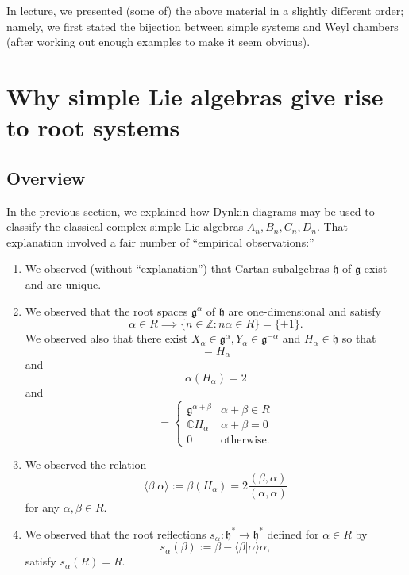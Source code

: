\documentclass[reqno]{amsart} 
\begin{document}
In lecture, we presented (some of) the above material in a slightly different order; namely, we first stated the bijection between simple systems and Weyl chambers (after working out enough examples to make it seem obvious).


\section{Why simple Lie algebras give rise to root systems}
\label{sec:orgbc4b3b3}

\subsection{Overview\label{sec:overview:simple-lie-alg-induce-root-systems}}
\label{sec:orgca704ad}
In the previous section, we explained how Dynkin diagrams may be used to classify the classical complex simple Lie algebras $A_n,B_n,C_n,D_n$.  That explanation involved a fair number of ``empirical observations:''
\begin{enumerate}
\item We observed (without ``explanation'') that Cartan subalgebras $\mathfrak{h}$ of $\mathfrak{g}$ exist and are unique.
\item We observed that the root spaces $\mathfrak{g}^\alpha$ of $\mathfrak{h}$ are one-dimensional and satisfy
  \begin{equation*}
    \alpha \in R \implies \{n \in \mathbb{Z} : n \alpha \in R\} = \{\pm 1\}.
  \end{equation*}
  We observed also that there exist $X_\alpha \in \mathfrak{g}^\alpha, Y_\alpha \in \mathfrak{g}^{-\alpha}$ and $H_\alpha \in \mathfrak{h}$ so that
  \begin{equation*}
 [X_\alpha,Y_\alpha] = H_\alpha
  \end{equation*}
  and
  \begin{equation*}
    \alpha(H_\alpha) = 2
  \end{equation*}
  and
  \begin{equation*}
 [\mathfrak{g}^\alpha, \mathfrak{g}^\beta]
    = 
\begin{cases}
      \mathfrak{g}^{\alpha+\beta} & \alpha + \beta \in R \\
      \mathbb{C} H_\alpha  & \alpha + \beta = 0 \\
      0 & \text{otherwise.}
    \end{cases}
  \end{equation*}
\item We observed the relation
  \begin{equation*}
    \langle \beta | \alpha \rangle := \beta(H_\alpha) = 2 \frac{(\beta,\alpha)}{(\alpha,\alpha)}
  \end{equation*}
  for any $\alpha, \beta \in R$.
\item We observed that the root reflections $s_\alpha : \mathfrak{h}^* \rightarrow \mathfrak{h}^*$ defined for $\alpha \in R$ by
  \begin{equation*}
    s_\alpha (\beta) := \beta - \langle \beta|\alpha \rangle \alpha,
  \end{equation*}
  satisfy $s_\alpha(R) = R$.
\end{enumerate}
\end{document}
